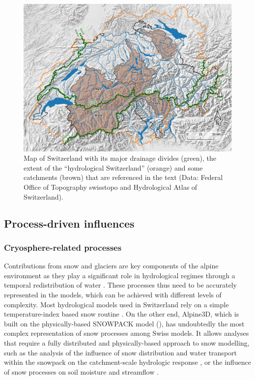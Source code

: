 \documentclass[10pt,a4paper]{article}
\begin{document}
\begin{figure}[htb]
	\begin{center}
		\includegraphics[width=0.95\columnwidth]{figures/map}
		\caption{{Map of Switzerland with its major drainage divides (green), the extent of the ``hydrological Switzerland'' (orange) and some catchments (brown) that are referenced in the text (Data: Federal Office of Topography swisstopo and Hydrological Atlas of Switzerland). \label{fig:map}
		}}
	\end{center}
\end{figure}


\subsection{Process-driven influences}
\label{sec:context:processes}


\subsubsection{Cryosphere-related processes}
\label{sec:context:cryosphere}

Contributions from snow and glaciers are key components of the alpine environment as they play a significant role in hydrological regimes through a temporal redistribution of water \citep{Barnett2005}. These processes thus need to be accurately represented in the models, which can be achieved with different levels of complexity. Most hydrological models used in Switzerland rely on a simple temperature-index based snow routine \citep[see for example][]{Jenicek2018}. On the other end, Alpine3D, which is built on the physically-based SNOWPACK model (\citealt{Bartelt2002, Lehning2002a, Lehning2002b}), has undoubtedly the most complex representation of snow processes among Swiss models. It allows analyses that require a fully distributed and physically-based approach to snow modelling, such as the analysis of the influence of snow distribution and water transport within the snowpack on the catchment-scale hydrologic response \citep{Brauchli2017}, or the influence of snow processes on soil moisture and streamflow \citep{Wever2017}.
\end{document}
